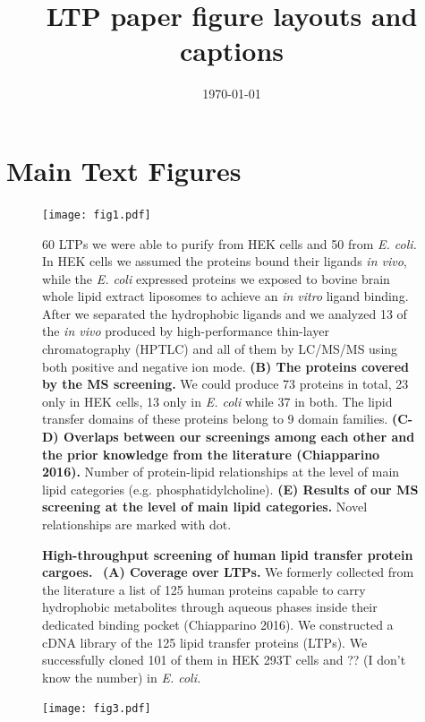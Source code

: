 \documentclass[11pt, a4paper]{article}
\title{LTP paper figure layouts and captions}
\date{\today}
\newcommand{\new}[1]{#1}
\begin{document}
    
    \section*{Main Text Figures}
    
    \begin{figure}[!h]
           \texttt{[image: fig1.pdf]}
       \caption{\label{fig:fig1}\textbf{High-throughput screening of human lipid transfer protein cargoes.} \textbullet\ \textbf{(A) Coverage over LTPs.} We formerly collected from the literature a list of 125 human proteins capable to carry hydrophobic metabolites through aqueous phases inside their dedicated binding pocket (Chiapparino 2016). We constructed a cDNA library of the 125 lipid transfer proteins (LTPs). We successfully cloned 101 of them in HEK 293T cells and ?? (\new{I don't know the number}) in \textit{E. coli.}} 60 LTPs we were able to purify from HEK cells and 50 from \textit{E. coli.} In HEK cells we assumed the proteins bound their ligands \textit{in vivo}, while the \textit{E. coli} expressed proteins we exposed to bovine brain whole lipid extract liposomes to achieve an \textit{in vitro} ligand binding. After we separated the hydrophobic ligands and we analyzed 13 of the \textit{in vivo} produced by high-performance thin-layer chromatography (HPTLC) and all of them by LC/MS/MS using both positive and negative ion mode. \textbf{(B) The proteins covered by the MS screening.} We could produce 73 proteins in total, 23 only in HEK cells, 13 only in \textit{E. coli} while 37 in both. The lipid transfer domains of these proteins belong to 9 domain families. \textbf{(C-D) Overlaps between our screenings among each other and the prior knowledge from the literature (Chiapparino 2016).} Number of protein-lipid relationships at the level of main lipid categories (e.g. phosphatidylcholine). \textbf{(E) Results of our MS screening at the level of main lipid categories.} Novel relationships are marked with dot.
    \end{figure}
   
    \clearpage
    
    \begin{figure}[p]
        \texttt{[image: fig3.pdf]}
    \end{figure}
\end{document}
